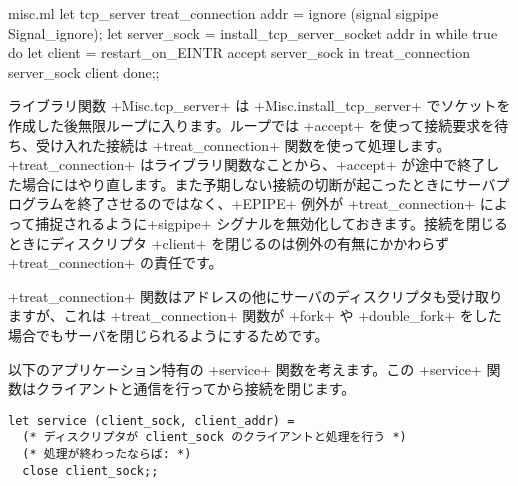 \begin{listingcodefile}{misc.ml}
let tcp_server treat_connection addr =
  ignore (signal sigpipe Signal_ignore);
  let server_sock = install_tcp_server_socket addr in
  while true do
      let client = restart_on_EINTR accept server_sock in
      treat_connection server_sock client
  done;;
\end{listingcodefile}
ライブラリ関数 \ml+Misc.tcp_server+ は \ml+Misc.install_tcp_server+ でソケットを作成した後無限ループに入ります。ループでは \ml+accept+ を使って接続要求を待ち、受け入れた接続は \ml+treat_connection+ 関数を使って処理します。\ml+treat_connection+ はライブラリ関数なことから、\ml+accept+ が途中で終了した場合にはやり直します。また予期しない接続の切断が起こったときにサーバプログラムを終了させるのではなく、\ml+EPIPE+ 例外が \ml+treat_connection+ によって捕捉されるように\ml+sigpipe+ シグナルを無効化しておきます。接続を閉じるときにディスクリプタ \ml+client+ を閉じるのは例外の有無にかかわらず \ml+treat_connection+ の責任です。

\ml+treat_connection+ 関数はアドレスの他にサーバのディスクリプタも受け取りますが、これは \ml+treat_connection+ 関数が \ml+fork+ や \ml+double_fork+ をした場合でもサーバを閉じられるようにするためです。

以下のアプリケーション特有の \ml+service+ 関数を考えます。この \ml+service+ 関数はクライアントと通信を行ってから接続を閉じます。
%
\begin{lstlisting}
let service (client_sock, client_addr) =
  (* ディスクリプタが client_sock のクライアントと処理を行う *)
  (* 処理が終わったならば: *)
  close client_sock;;
\end{lstlisting}
%

